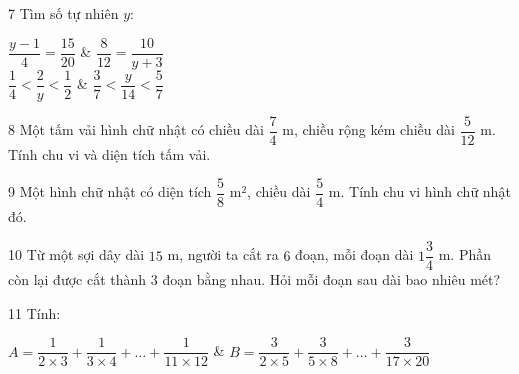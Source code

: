 \gap
\begin{probbox}{7}{\relax}
Tìm số tự nhiên $y$:
\begin{cols2}
 $\dfrac{y-1}{4}=\dfrac{15}{20}$ &  $\dfrac8{12}=\dfrac{10}{y+3}$\\
 $\dfrac14<\dfrac2y<\dfrac12$ &  $\dfrac37<\dfrac{y}{14}<\dfrac57$
\end{cols2}
\end{probbox}
\gap
\begin{probbox}{8}{\relax}
Một tấm vải hình chữ nhật có chiều dài $\dfrac74$ m, chiều rộng kém chiều dài $\dfrac5{12}$ m. Tính chu vi và diện tích tấm vải.
\end{probbox}
\gap
\begin{probbox}{9}{\relax}
Một hình chữ nhật có diện tích $\dfrac58$ m$^2$, chiều dài $\dfrac54$ m. Tính chu vi hình chữ nhật đó.
\end{probbox}
\gap
\begin{probbox}{10}{\relax}
Từ một sợi dây dài $15$ m, người ta cắt ra $6$ đoạn, mỗi đoạn dài $1\dfrac34$ m. Phần còn lại được cắt thành $3$ đoạn bằng nhau. Hỏi mỗi đoạn sau dài bao nhiêu mét?
\end{probbox}
\gap
\begin{probbox}{11}{\relax}
Tính:
\begin{cols2}
$A=\dfrac1{2\times3}+\dfrac1{3\times4}+\dots+\dfrac1{11\times12}$ & $B=\dfrac3{2\times5}+\dfrac3{5\times8}+\dots+\dfrac3{17\times20}$
\end{cols2}
\end{probbox}
